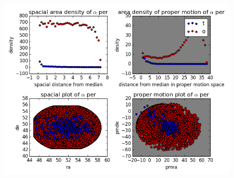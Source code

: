 \documentclass{article}
\begin{document}
\includegraphics[width=0.9\textwidth]{quadplot}
\end{document}
